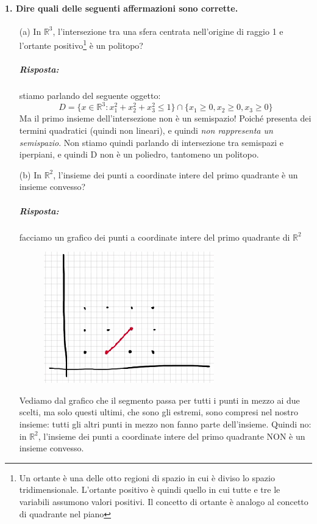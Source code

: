 \paragraph{1. Dire quali delle seguenti affermazioni sono corrette.}
\begin{itemize}
    
    \item[(a)] In $\mathbb{R}^3$, l'intersezione tra una sfera centrata nell'origine di raggio 1 e l'ortante positivo\footnote{Un ortante è una delle otto regioni di spazio in cui è diviso lo spazio tridimensionale. L'ortante positivo è quindi quello in cui tutte e tre le variabili assumono valori positivi. Il concetto di ortante è analogo al concetto di quadrante nel piano} è un politopo?
    
    \subparagraph{Risposta:} stiamo parlando del seguente oggetto:
    \begin{equation*}
        D = \{x \in \mathbb{R}^3: x_1^2 + x_2^2 + x_3^2 \leq 1\} \cap \{x_1 \geq 0, x_2 \geq 0, x_3 \geq 0\}
    \end{equation*}
    Ma il primo insieme dell'intersezione non è un semispazio! Poiché presenta dei termini quadratici (quindi non lineari), e quindi \textit{non rappresenta un semispazio}. Non stiamo quindi parlando di intersezione tra semispazi e iperpiani, e quindi D non è un poliedro, tantomeno un politopo.
    
    
    \item[(b)] In $\mathbb{R}^2$, l'insieme dei punti a coordinate intere del primo quadrante è un insieme convesso?
    
    \subparagraph{Risposta:} facciamo un grafico dei punti a coordinate intere del primo quadrante di $\mathbb{R}^2$
    \begin{figure}[h!]
        \centering
        \includegraphics{puntiinteriprimoquadrantepiano}
    \end{figure}
    Vediamo dal grafico che il segmento passa per tutti i punti in mezzo ai due scelti, ma solo questi ultimi, che sono gli estremi, sono compresi nel nostro insieme: tutti gli altri punti in mezzo non fanno parte dell'insieme. Quindi no: in $\mathbb{R}^2$, l'insieme dei punti a coordinate intere del primo quadrante NON è un insieme convesso.
    

\end{itemize}
